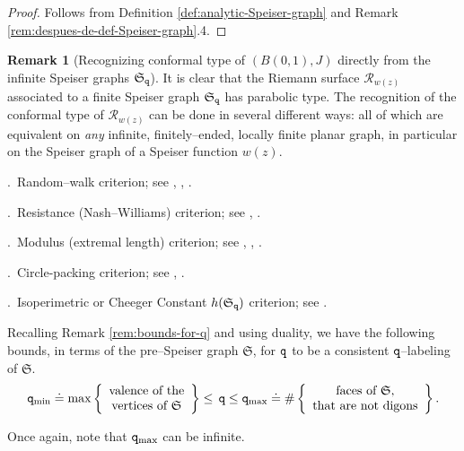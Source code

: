 \documentclass[final,3p,times]{elsarticle}
\newcommand{\R}{\ensuremath{{\mathcal R}}}
\theoremstyle{definition}
\newtheorem{remark}[theorem]{Remark}
\begin{document}
\begin{proof}
Follows from Definition 
\ref{def:analytic-Speiser-graph} and 
Remark \ref{rem:despues-de-def-Speiser-graph}.4.
\end{proof}

\begin{remark}[Recognizing conformal type of $(B(0,1),J)$
directly from the infinite Speiser graphs $\mathfrak{S}_{\tt q}$]
\label{rem:Conformal-type-Speiser-graph}
It is clear that the Riemann surface $\R_{w(z)}$ associated to a finite Speiser graph 
$\mathfrak{S}_{\tt q}$ has parabolic type.
The recognition of the conformal type of $\R_{w(z)}$ can be done in several different ways:
all of which are equivalent on \emph{any} infinite, finitely--ended, locally finite planar graph, 
in particular on the Speiser graph of a Speiser function $w(z)$. 

.\  
Random--walk criterion; see \cite{Doyle-Snell}, \cite{Woess}, \cite{Lyons-Peres}.


.\  
Resistance (Nash–Williams) criterion; see \cite{Nash-Williams}, \cite{Soardi}.

.\  
Modulus (extremal length) criterion; see \cite{Duffin}, \cite{Benjamini-Schramm}, \cite{Heinonen-Koskela}. 

\noindent
4.\  
Circle-packing criterion; see \cite{He-Schramm}, \cite{Stephenson}. 

\noindent
5.\ 
Isoperimetric or Cheeger Constant $h(\mathfrak{S}_{\tt q})$ criterion; see \cite{Dodziuk}.
\end{remark}

Recalling Remark \ref{rem:bounds-for-q} and using duality, we have the following bounds, in terms of the pre--Speiser graph $\mathfrak{S}$, for $\tt q$ to be a 
consistent $\tt q$--labeling of $\mathfrak{S}$.
\begin{equation}
\label{cota-q-graficas}
{\tt q}_{\text{min}} \doteq 
\max \left\{ 
\begin{array}{c}
\text{valence of the}\\ 
\text{vertices of } \mathfrak{S}
\end{array}
\right \} 
\leq  \, {\tt q} \leq 
{\tt q}_{\text{max}} \doteq
\# \left \{ \begin{array}{c}
\text{faces of } \mathfrak{S}, \\
\text{that are not digons}
\end{array}
\right\} .
\end{equation}

\noindent
Once again, note that ${\tt q}_{\text{max}}$ can be infinite.
\end{document}
